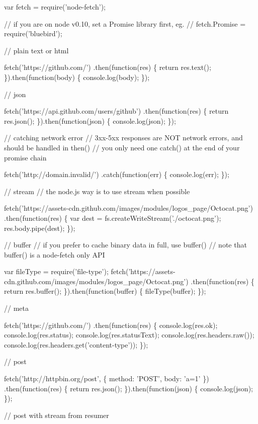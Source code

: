 \begin{DoxyCode}
var fetch = require('node-fetch');

// if you are on node v0.10, set a Promise library first, eg.
// fetch.Promise = require('bluebird');

// plain text or html

fetch('https://github.com/')
    .then(function(res) \{
        return res.text();
    \}).then(function(body) \{
        console.log(body);
    \});

// json

fetch('https://api.github.com/users/github')
    .then(function(res) \{
        return res.json();
    \}).then(function(json) \{
        console.log(json);
    \});

// catching network error
// 3xx-5xx responses are NOT network errors, and should be handled in then()
// you only need one catch() at the end of your promise chain

fetch('http://domain.invalid/')
    .catch(function(err) \{
        console.log(err);
    \});

// stream
// the node.js way is to use stream when possible

fetch('https://assets-cdn.github.com/images/modules/logos\_page/Octocat.png')
    .then(function(res) \{
        var dest = fs.createWriteStream('./octocat.png');
        res.body.pipe(dest);
    \});

// buffer
// if you prefer to cache binary data in full, use buffer()
// note that buffer() is a node-fetch only API

var fileType = require('file-type');
fetch('https://assets-cdn.github.com/images/modules/logos\_page/Octocat.png')
    .then(function(res) \{
        return res.buffer();
    \}).then(function(buffer) \{
        fileType(buffer);
    \});

// meta

fetch('https://github.com/')
    .then(function(res) \{
        console.log(res.ok);
        console.log(res.status);
        console.log(res.statusText);
        console.log(res.headers.raw());
        console.log(res.headers.get('content-type'));
    \});

// post

fetch('http://httpbin.org/post', \{ method: 'POST', body: 'a=1' \})
    .then(function(res) \{
        return res.json();
    \}).then(function(json) \{
        console.log(json);
    \});

// post with stream from resumer


\end{DoxyCode}
